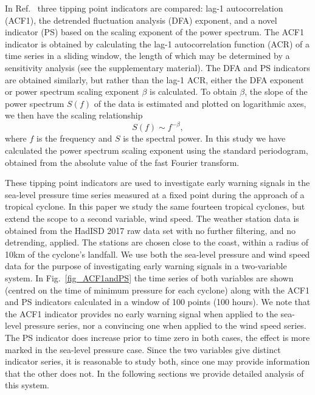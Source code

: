 \documentclass[%
aip,
amsmath,amssymb,
reprint,%
]{revtex4-1}
\newcommand{\noteRed}[1]{{#1}}
\begin{document}
In Ref.~ three {\noteRed tipping point} indicators are compared: lag-1 autocorrelation (ACF1), the detrended fluctuation analysis (DFA) exponent, and a novel indicator (PS) based on the scaling exponent of the power spectrum. {\noteRed The ACF1 indicator is obtained by calculating the lag-1 autocorrelation function (ACR) of a time series in a sliding window, the length of which may be determined by a sensitivity analysis (see the supplementary material). The DFA and PS indicators are  obtained similarly, but rather than the lag-1 ACR, either the DFA exponent\cite{kantelhardt2001} or power spectrum scaling exponent $\beta$ is calculated. To obtain $\beta$, the slope of the power spectrum $S(f)$ of the data is estimated and plotted on logarithmic axes\cite{bak1988}, we then have the scaling relationship 
	\begin{equation}
	\label{eqn:1D:PSexponent}
	S(f) \sim f^{-\beta},
	\end{equation} 
where $f$ is the frequency and $S$ is the spectral power. In this study we have calculated the power spectrum scaling exponent using the standard periodogram, obtained from the absolute value of the fast Fourier transform.}

These {\noteRed tipping point indicators} are used to investigate early warning signals in the sea-level pressure time series measured at a fixed point during the approach of a tropical cyclone. In this paper we study the same fourteen tropical cyclones, but extend the scope to a second variable, wind speed. The weather station data is obtained from the HadISD 2017 raw data set \cite{HadISD,HadISD_dunn12,HadISD_dunn14,HadISD_dunn16,HadISD_smith} with no further filtering, and no detrending, applied. The stations are chosen close to the coast, within a radius of 10km of the cyclone's landfall. We use both the sea-level pressure and wind speed data for the purpose of investigating early warning signals in a two-variable system. In Fig.~\ref{fig_ACF1andPS} the time series of both variables are shown (centred on the time of minimum pressure for each cyclone) along with the ACF1 and PS indicators calculated in a window of 100 points (100 hours). We note that the ACF1 indicator provides no early warning signal when applied to the sea-level pressure series, nor a convincing one when applied to the wind speed series. The PS indicator does increase prior to time zero in both cases, the effect is more marked in the sea-level pressure case. Since the two variables give distinct indicator series, it is reasonable to study both, since one may provide information that the other does not. In the following sections we provide detailed analysis of this system.
\end{document}
